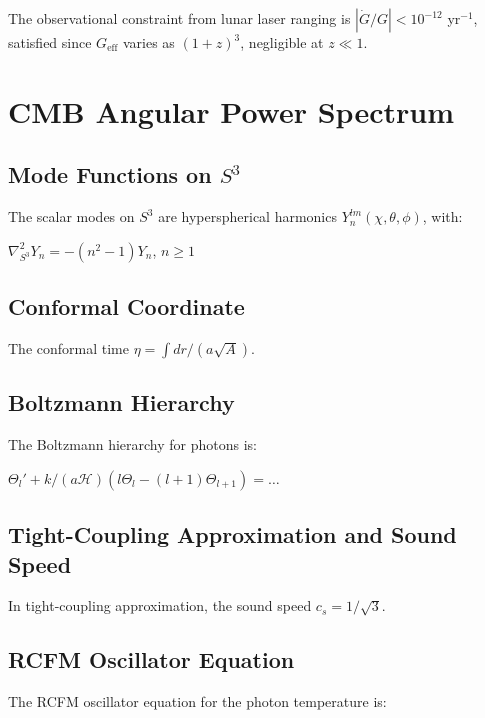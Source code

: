 \documentclass[10pt,twocolumn]{article}
\theoremstyle{definition}
\newcommand{\Hcal}{\mathcal{H}}
\begin{document}
The observational constraint from lunar laser ranging \citep{Hofmann2018} is \( |\dot{G} / G| < 10^{-12} \) yr\( ^{-1} \), satisfied since \( G_{\mathrm{eff}} \) varies as \( (1 + z)^{3} \), negligible at \( z \ll 1 \).

\section{CMB Angular Power Spectrum}
\label{sec:cmb}

\subsection{Mode Functions on \( S^{3} \)}

The scalar modes on \( S^{3} \) are hyperspherical harmonics \( Y_{n}^{lm} (\chi, \theta, \phi) \), with:

\( \nabla^{2}_{S^{3}} Y_{n} = - (n^{2} - 1) Y_{n} \), \( n \geq 1 \)

\subsection{Conformal Coordinate}

The conformal time \( \eta = \int dr / (a \sqrt{A}) \).

\subsection{Boltzmann Hierarchy}

The Boltzmann hierarchy for photons is:

\( \Theta_{l}' + k / (a \Hcal) (l \Theta_{l} - (l+1) \Theta_{l+1}) = \dots \)

\subsection{Tight-Coupling Approximation and Sound Speed}

In tight-coupling approximation, the sound speed \( c_{s} = 1 / \sqrt{3} \).

\subsection{RCFM Oscillator Equation}

The RCFM oscillator equation for the photon temperature is:
\end{document}

